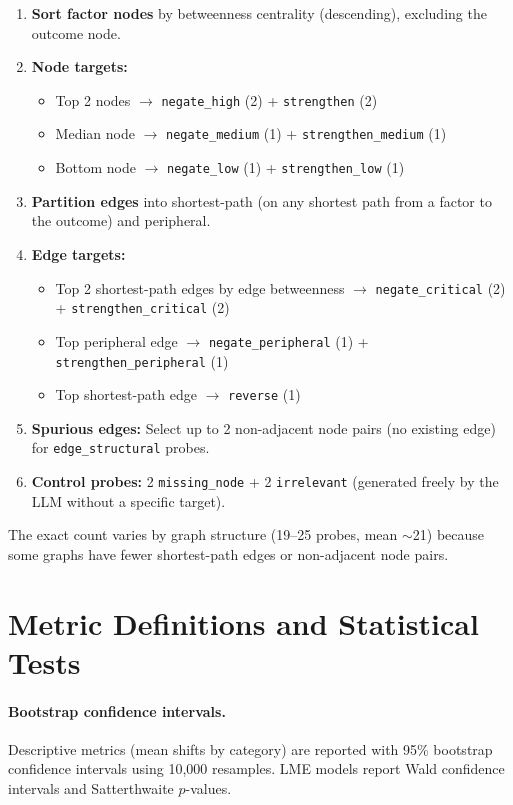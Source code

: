 \documentclass[11pt]{article}
\begin{document}
\begin{enumerate}
\item \textbf{Sort factor nodes} by betweenness centrality (descending), excluding the outcome node.
\item \textbf{Node targets:}
    \begin{itemize}
    \item Top 2 nodes $\rightarrow$ \texttt{negate\_high} (2) + \texttt{strengthen} (2)
    \item Median node $\rightarrow$ \texttt{negate\_medium} (1) + \texttt{strengthen\_medium} (1)
    \item Bottom node $\rightarrow$ \texttt{negate\_low} (1) + \texttt{strengthen\_low} (1)
    \end{itemize}
\item \textbf{Partition edges} into shortest-path (on any shortest path from a factor to the outcome) and peripheral.
\item \textbf{Edge targets:}
    \begin{itemize}
    \item Top 2 shortest-path edges by edge betweenness $\rightarrow$ \texttt{negate\_critical} (2) + \texttt{strengthen\_critical} (2)
    \item Top peripheral edge $\rightarrow$ \texttt{negate\_peripheral} (1) + \texttt{strengthen\_peripheral} (1)
    \item Top shortest-path edge $\rightarrow$ \texttt{reverse} (1)
    \end{itemize}
\item \textbf{Spurious edges:} Select up to 2 non-adjacent node pairs (no existing edge) for \texttt{edge\_structural} probes.
\item \textbf{Control probes:} 2 \texttt{missing\_node} + 2 \texttt{irrelevant} (generated freely by the LLM without a specific target).
\end{enumerate}

The exact count varies by graph structure (19--25 probes, mean ${\sim}$21) because some graphs have fewer shortest-path edges or non-adjacent node pairs.

\section{Metric Definitions and Statistical Tests}
\label{app:metrics}

\paragraph{Bootstrap confidence intervals.} Descriptive metrics (mean shifts by category) are reported with 95\% bootstrap confidence intervals using 10,000 resamples. LME models report Wald confidence intervals and Satterthwaite $p$-values.
\end{document}
